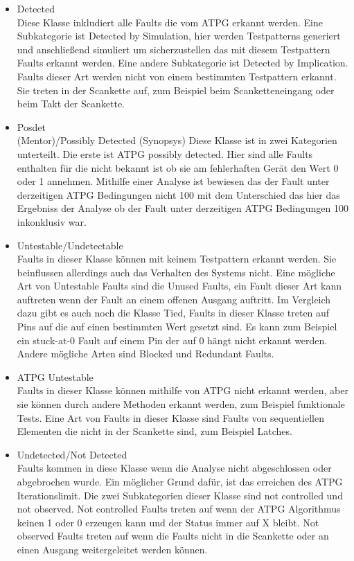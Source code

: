 \documentclass[12pt,a4paper]{article}
\begin{document}
\begin{itemize}

\item Detected\\
Diese Klasse inkludiert alle Faults die vom ATPG erkannt werden. Eine Subkategorie ist Detected by Simulation, hier 
werden Testpatterns generiert und anschließend simuliert um sicherzustellen das mit diesem Testpattern Faults erkannt werden.
Eine andere Subkategorie ist Detected by Implication. Faults dieser Art werden nicht von einem bestimmten Testpattern erkannt.
Sie treten in der Scankette auf, zum Beispiel beim Scanketteneingang oder beim Takt der Scankette.

\item Posdet\\ (Mentor)/Possibly Detected (Synopsys)
Diese Klasse ist in zwei Kategorien unterteilt. Die erste ist ATPG possibly detected. Hier sind alle Faults enthalten für die
nicht bekannt ist ob sie am fehlerhaften Gerät den Wert 0 oder 1 annehmen. Mithilfe einer Analyse ist bewiesen das der Fault
unter derzeitigen ATPG Bedingungen nicht 100%
mit dem Unterschied das hier das Ergebniss der Analyse ob der Fault unter derzeitigen ATPG Bedingungen 100%
inkonklusiv war.

\item Untestable/Undetectable\\
Faults in dieser Klasse können mit keinem Testpattern erkannt werden. Sie beinflussen allerdings auch das Verhalten des
Systems nicht. Eine mögliche Art von Untestable Faults sind die Unused Faults, ein Fault dieser Art kann auftreten wenn 
der Fault an einem offenen Ausgang auftritt. Im Vergleich dazu gibt es auch noch die Klasse Tied, Faults in dieser Klasse
treten auf Pins auf die auf einen bestimmten Wert gesetzt sind. Es kann zum Beispiel ein stuck-at-0 Fault auf einem Pin
der auf 0 hängt nicht erkannt werden. Andere mögliche Arten sind Blocked und Redundant Faults.

\item ATPG Untestable\\
Faults in dieser Klasse können mithilfe von ATPG nicht erkannt werden, aber sie können durch andere Methoden erkannt werden,
zum Beispiel funktionale Tests. Eine Art von Faults in dieser Klasse sind Faults von sequentiellen Elementen die nicht in der
Scankette sind, zum Beispiel Latches.

\item Undetected/Not Detected\\
Faults kommen in diese Klasse wenn die Analyse nicht abgeschlossen oder abgebrochen wurde. Ein möglicher Grund dafür,
ist das erreichen des ATPG Iterationslimit. Die zwei Subkategorien dieser Klasse sind not controlled und not observed.
Not controlled Faults treten auf wenn der ATPG Algorithmus keinen 1 oder 0 erzeugen kann und der Status immer auf X bleibt.
Not observed Faults treten auf wenn die Faults nicht in die Scankette oder an einen Ausgang weitergeleitet werden können.

\end{itemize}
\end{document}

